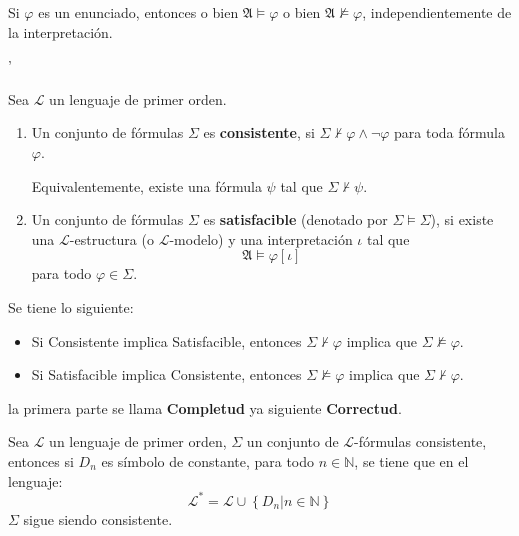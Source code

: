\documentclass[12pt]{report}
\newcounter{it}
\theoremstyle{largebreak}
\begin{document}
    \begin{obs}
        Si $\varphi$ es un enunciado, entonces o bien $\mathfrak{A}\vDash\varphi$ o bien $\mathfrak{A}\nvDash\varphi$, independientemente de la interpretación.
    \end{obs}

    '\begin{mydef}
        Sea $\mathcal{L}$ un lenguaje de primer orden.
        \begin{enumerate}
            \item Un conjunto de fórmulas $\Sigma$ es \textbf{consistente}, si $\Sigma\nvdash\varphi\land\neg\varphi$ para toda fórmula $\varphi$.

            Equivalentemente, existe una fórmula $\psi$ tal que $\Sigma\nvdash\psi$.
            \item Un conjunto de fórmulas $\Sigma$ es \textbf{satisfacible} (denotado por $\Sigma\vDash\Sigma$), si existe una $\mathcal{L}$-estructura (o $\mathcal{L}$-modelo) y una interpretación $\iota$ tal que
            \begin{equation*}
                \mathfrak{A}\vDash\varphi[\iota]
            \end{equation*}
            para todo $\varphi\in\Sigma$.
        \end{enumerate}
    \end{mydef}

    \begin{obs}
        Se tiene lo siguiente:
        \begin{itemize}
            \item Si Consistente implica Satisfacible, entonces $\Sigma\nvdash\varphi$ implica que $\Sigma\nvDash\varphi$.
            \item Si Satisfacible implica Consistente, entonces $\Sigma\nvDash\varphi$ implica que $\Sigma\nvdash\varphi$.
        \end{itemize}
        la primera parte se llama \textbf{Completud} ya siguiente \textbf{Correctud}.
    \end{obs}

    \begin{lema}[Nombre]
        Sea $\mathcal{L}$ un lenguaje de primer orden, $\Sigma$ un conjunto de $\mathcal{L}$-fórmulas consistente, entonces si $D_n$ es símbolo de constante, para todo $n\in\mathbb{N}$, se tiene que en el lenguaje:
        \begin{equation*}
            \mathcal{L}^*=\mathcal{L}\cup\left\{D_n\Big|n\in\mathbb{N} \right\}
        \end{equation*}
        $\Sigma$ sigue siendo consistente.
    \end{lema}
\end{document}
